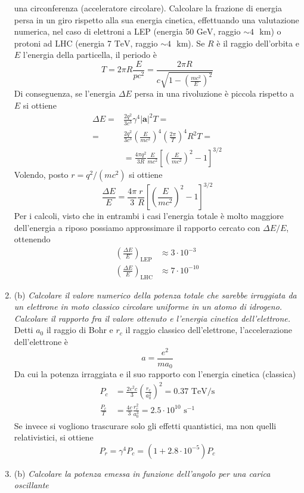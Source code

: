 \documentclass{article}
\renewcommand{\b}{(b)}
\renewcommand{\t}[1]{\textit{ #1}}
\renewcommand{\vec}[1]{\mathbf{#1}}
\begin{document}
\begin{enumerate}
{		una circonferenza (acceleratore circolare). Calcolare la frazione di energia persa
		in un giro rispetto alla sua energia cinetica, effettuando una valutazione numerica,
		nel caso di elettroni a LEP (energia 50 $\mathrm{GeV}$, raggio $\sim4\textrm{ }\mathrm{ km}$) o protoni ad LHC
		(energia 7 $\mathrm{TeV}$, raggio $\sim4\textrm{ }\mathrm{ km}$).}
	Se $R$ è il raggio dell'orbita e $E$ l'energia della particella, il periodo è
	\[T=2\pi R\frac{E}{pc^2}=\frac{2\pi R}{c\sqrt{1-\left(\frac{mc^2}{E}\right)^2}}\]
	Di conseguenza, se l'energia  $\Delta E$ persa in una rivoluzione è piccola rispetto a $E$ si ottiene
	\begin{align*}\Delta E=&\frac{2q^2}{3c^3}\gamma^4|\vec{a}|^2T=\\=&\frac{2q^2}{3c^3}\left(\frac{E}{mc^2}\right)^4\left(\frac{2\pi}{T}\right)^4R^2T=\\&=\frac{4\pi q^2}{3R}\frac{E}{mc^2}\left[\left(\frac{E}{mc^2}\right)^2-1\right]^{3/2}\end{align*}
	Volendo, posto $r=q^2/(mc^2)$ si ottiene
	\[\frac{\Delta E}{E}=\frac{4\pi}{3}\frac{r}{R}\left[\left(\frac{E}{mc^2}\right)^2-1\right]^{3/2}\]
	Per i calcoli, visto che in entrambi i casi l'energia totale è molto maggiore dell'energia a riposo possiamo approssimare il rapporto cercato con $\Delta E/E$, ottenendo
	\begin{align*}
		\left(\frac{\Delta E}{E}\right)_\textrm{LEP}&\approx3\cdot10^{-3}\\\left(\frac{\Delta E}{E}\right)_\textrm{LHC}&\approx7\cdot10^{-10}
	\end{align*}
	\item\b\t{Calcolare il valore numerico della potenza totale che sarebbe irraggiata da un
		elettrone in moto classico circolare uniforme in un atomo di idrogeno. Calcolare il
		rapporto fra il valore ottenuto e l’energia cinetica dell’elettrone.}
	Detti $a_0$ il raggio di Bohr e $r_c$ il raggio classico dell'elettrone, l'accelerazione dell'elettrone è
	\[a=\frac{e^2}{ma_0}\]
	Da cui la potenza irraggiata e il suo rapporto con l'energia cinetica (classica)
	\begin{align*}
		P_c&=\frac{2e^2c}{3}\left(\frac{r_c}{a_0^2}\right)^2=0.37\textrm{ TeV/s}\\\frac{P_c}{T}&=\frac{4c}{3}\frac{r_c^2}{a_0^3}=2.5\cdot10^{10}\textrm{ s}^{-1}
	\end{align*}
	Se invece si vogliono trascurare solo gli effetti quantistici, ma non quelli relativistici, si ottiene
	\[P_r=\gamma^4P_c=(1+2.8\cdot10^{-5})P_c\]
	\item\b\t{Calcolare la potenza emessa in funzione dell’angolo per una carica oscillante
}
\end{enumerate}
\end{document}
